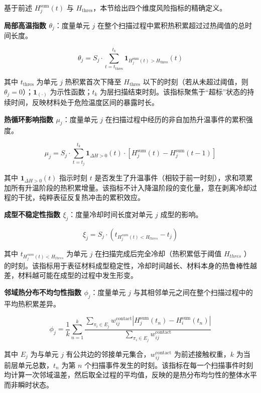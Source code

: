 \documentclass[a4paper, 12pt]{ctexart}
\begin{document}
基于前述 $H_j^{\text{sum}}(t)$ 与 $H_{\text{thres}}$，本节给出四个维度风险指标的精确定义。

\textbf{局部高温指数 $\theta_j$}：度量单元 $j$ 在整个扫描过程中累积热积累超过过热阈值的总时间长度。

\begin{equation}
    \theta_j = S_j \cdot \sum_{t = t_{\text{thres}}}^{t_k} \mathbf{1}_{H_j^{\text{sum}}(t) > H_{\text{thres}}}(t)
\end{equation}

其中 $t_{\text{thres}}$ 为单元 $j$ 热积累首次下降至 $H_{\text{thres}}$ 以下的时刻（若从未超过阈值，则 $\theta_j = 0$）；$\mathbf{1}_{(\cdot)}$ 为示性函数；$t_k$ 为层扫描结束时刻。该指标聚焦于“超标”状态的持续时间，反映材料处于危险温度区间的暴露时长。

\textbf{热循环影响指数 $\mu_j$}：度量单元 $j$ 在扫描过程中经历的非自加热升温事件的累积强度。

\begin{equation}
    \mu_j = S_j \cdot \sum_{t = t_j}^{t_k} \mathbf{1}_{\Delta H > 0}(t) \cdot \left[ H_j^{\text{sum}}(t) - H_j^{\text{sum}}(t-1) \right]
\end{equation}

其中 $\mathbf{1}_{\Delta H > 0}(t)$ 指示时刻 $t$ 是否发生了升温事件（相较于前一时刻），求和项累加所有升温阶段的热积累增量。该指标不计入降温阶段的变化量，意在剥离冷却过程的干扰，纯粹表征反复热冲击的累积效应。

\textbf{成型不稳定性指数 $\xi_j$}：度量冷却时间长度对单元 $j$ 成型的影响。

\begin{equation}
    \xi_j = S_j \cdot (t_{H^{sum}_j(t) < H_{thres}} - t_j)
\end{equation}

其中 $t_{H^{sum}_j(t) < H_{thres}}$ 为单元 $j$ 在扫描完成后完全冷却（热积累低于阈值 $H_{thres}$ ）的时刻。该指标用于表征材料成型稳定性，冷却时间越长、材料本身的热鲁棒性越差，材料越可能在成型的过程中发生形变。

\textbf{邻域热分布不均匀性指数 $\phi_j$}：度量单元 $j$ 与其相邻单元之间在整个扫描过程中的平均热积累差异。

\begin{equation}
    \phi_j = \frac{1}{k} \sum_{n=1}^{k} \frac{ \sum_{\pi_i \in E_j} w_{ij}^{\text{contact}} \left| H_j^{\text{sum}}(t_n) - H_i^{\text{sum}}(t_n) \right| }{ \sum_{\pi_i \in E_j} w_{ij}^{\text{contact}} }
\end{equation}

其中 $E_j$ 为与单元 $j$ 有公共边的邻接单元集合，$w_{ij}^{\text{contact}}$ 为前述接触权重，$k$ 为当前层单元总数，$t_n$ 为第 $n$ 个扫描事件发生的时刻。该指标在每一个扫描事件时刻均计算一次邻域温差，然后取全过程的平均值，反映的是热分布均匀性的整体水平而非瞬时状态。
\end{document}
